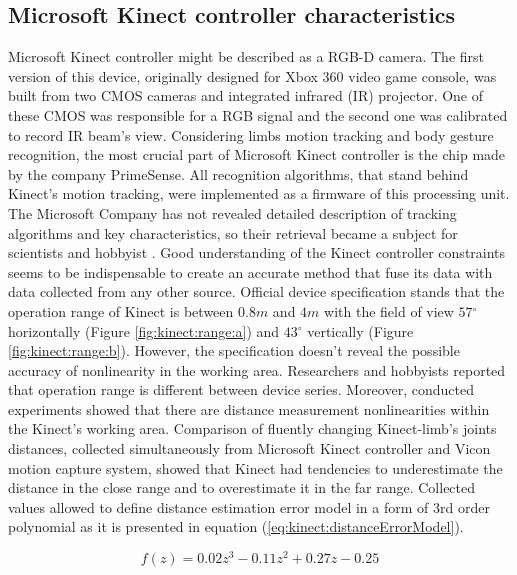 \documentclass[sensors,article,submit,moreauthors,pdftex,10pt,a4paper]{mdpi}
\newcommand{\degree}{\ensuremath{{}^{\circ}}\xspace}
\begin{document}
\subsection{Microsoft Kinect controller characteristics}
Microsoft Kinect controller might be described as a RGB-D camera. The first version of this device, originally designed for Xbox 360 video game console, was built from two CMOS cameras and integrated infrared (IR) projector. One of these CMOS was responsible for a RGB signal and the second one was calibrated to record IR beam’s view. Considering limbs motion tracking and body gesture recognition, the most crucial part of Microsoft Kinect controller is the chip made by the company PrimeSense. All recognition algorithms, that stand behind Kinect’s motion tracking, were implemented as a firmware of this processing unit. 
The Microsoft Company has not revealed detailed description of tracking algorithms and key characteristics, so their retrieval became a subject for scientists and hobbyist \cite{Skalski2015,Gonzalez-Jorge2013,Khoshelham2012}. Good understanding of the Kinect controller constraints seems to be indispensable to create an accurate method that fuse its data with data collected from any other source. 
Official device specification stands that the operation range of Kinect is between $0.8m$ and $4m$ with the field of view $57\degree$ horizontally (Figure \ref{fig:kinect:range:a}) and $43\degree$ vertically (Figure \ref{fig:kinect:range:b}). However, the specification doesn't reveal the possible accuracy of nonlinearity in the working area. Researchers \cite{DiFilippo2015} and hobbyists \cite{stack:kinect2011} reported that operation range is different between device series. Moreover, conducted experiments showed that there are distance measurement nonlinearities within the Kinect’s working area.
Comparison of fluently changing Kinect-limb’s joints distances, collected simultaneously from Microsoft Kinect controller and Vicon motion capture system, showed that Kinect had tendencies to underestimate the distance in the close range and to overestimate it in the far range. Collected values allowed to define distance estimation error model in a form of 3rd order polynomial as it is presented in equation (\ref{eq:kinect:distanceErrorModel}).

\begin{equation}
	f(z)=0.02z^3-0.11z^2+0.27z-0.25 
	\label{eq:kinect:distanceErrorModel}
\end{equation}
\end{document}
